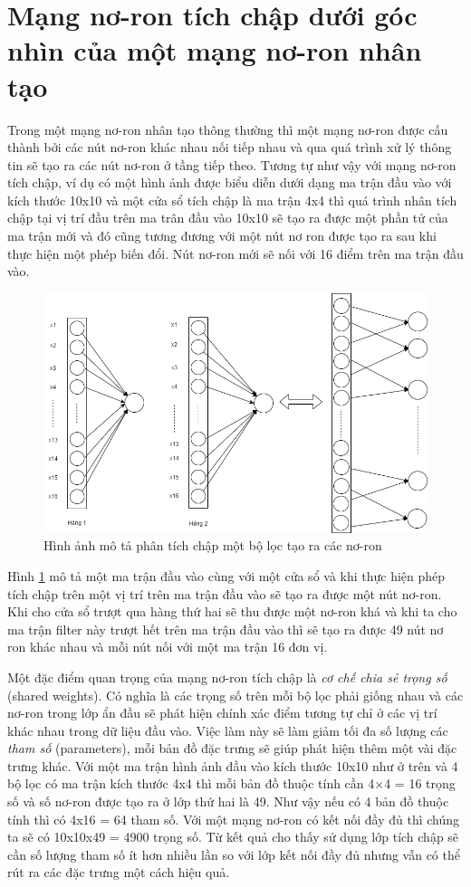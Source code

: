 \section{Mạng nơ-ron tích chập dưới góc nhìn của một mạng nơ-ron nhân tạo}
\hspace{\parindent} Trong một mạng nơ-ron nhân tạo thông thường thì một mạng nơ-ron được cấu thành bởi các nút nơ-ron khác nhau nối tiếp nhau và qua quá trình xử lý thông tin sẽ tạo ra các nút nơ-ron ở tầng tiếp theo. Tương tự như vậy với mạng nơ-ron tích chập, ví dụ có một hình ảnh được biểu diễn dưới dạng ma trận đầu vào với kích thước 10x10 và một cửa sổ tích chập là ma trận 4x4 thì quá trình nhân tích chập tại vị trí đầu trên ma trân đầu vào 10x10 sẽ tạo ra được một phần tử của ma trận mới và đó cũng tương đương với một nút nơ ron được tạo ra sau khi thực hiện một phép biến đổi. Nút nơ-ron mới sẽ nối với 16 điểm trên ma trận đầu vào.

\begin{figure}[!h]
	\centering
		\includegraphics[width=0.8\columnwidth]{books/artificial-neural-network/chapter05/figure/cnn_filter.png}
		\centering
	\caption{Hình ảnh mô tả phân tích chập một bộ lọc tạo ra các nơ-ron}
	\label{fig:CNN}
\end{figure}

Hình \ref{fig:CNN} mô tả một ma trận đầu vào cùng với một cửa sổ và khi thực hiện phép tích chập trên một vị trí trên ma trận đầu vào sẽ tạo ra được một nút nơ-ron. Khi cho cửa sổ trượt qua hàng thứ hai sẽ thu được một nơ-ron khá và khi ta cho ma trận filter này trượt hết trên ma trận đầu vào thì sẽ tạo ra được 49 nút nơ ron khác nhau và mỗi nút nối với một ma trận 16 đơn vị.


Một đặc điểm quan trọng của mạng nơ-ron tích chập là \textit{cơ chế chia sẻ trọng số} (shared weights). Có nghĩa là các trọng số trên mỗi bộ lọc phải giống nhau và các nơ-ron trong lớp ẩn đầu sẽ phát hiện chính xác điểm tương tự chỉ ở các vị trí khác nhau trong dữ liệu đầu vào. Việc làm này sẽ làm giảm tối đa số lượng các \textit{tham số} (parameters), mỗi bản đồ đặc trưng sẽ giúp phát hiện thêm một vài đặc trưng khác.
Với một ma trận hình ảnh đầu vào kích thước 10x10 như ở trên và 4 bộ lọc có ma trận kích thước 4x4 thì mỗi bản đồ thuộc tính cần 4×4 = 16 trọng số và số nơ-ron được tạo ra ở lớp thứ hai là 49. Như vậy nếu có 4 bản đồ thuộc tính thì có 4x16 = 64 tham số. Với một mạng nơ-ron có kết nối đầy đủ thì chúng ta sẽ có 10x10x49 = 4900 trọng số. Từ kết quả cho thấy sử dụng lớp tích chập sẽ cần số lượng tham số ít hơn nhiều lần so với lớp kết nối đầy đủ nhưng vẫn có thể rút ra các đặc trưng một cách hiệu quả.

